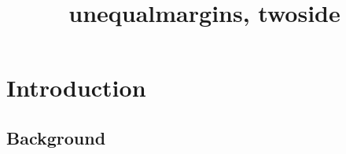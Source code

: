 \documentclass[
  unequalmargins,
  twoside,
  a5paper,
]{ut-thesis}
\title{unequalmargins, twoside}
\begin{document}
  \maketitle
  \chapter{Introduction}
  \lipsum[1-2]
  \section{Background}
  \lipsum[3-4]
\end{document}
